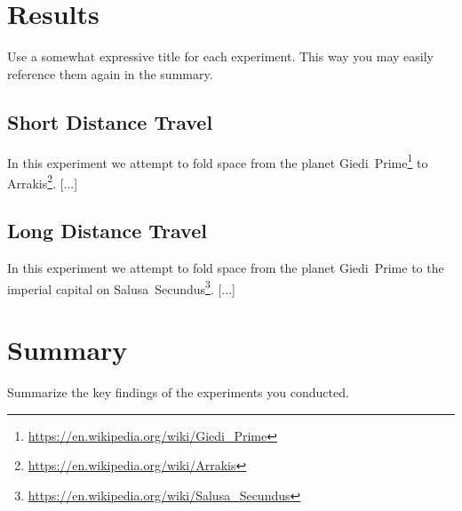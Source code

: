 \section{Results}
\label{s:Experiment-Results}

Use a somewhat expressive title for each experiment. This way you may easily reference them again in the summary.

\subsection{Short Distance Travel}
\label{s:Short-Distance-Experiment}

In this experiment we attempt to fold space from the planet Giedi~Prime\footnote{\url{https://en.wikipedia.org/wiki/Giedi_Prime}} to Arrakis\footnote{\url{https://en.wikipedia.org/wiki/Arrakis}}. [...]


\subsection{Long Distance Travel}
\label{s:Long-Distance-Experiment}

In this experiment we attempt to fold space from the planet Giedi~Prime to the imperial capital on Salusa~Secundus\footnote{\url{https://en.wikipedia.org/wiki/Salusa_Secundus}}. [...]


\section{Summary}
\label{s:Experiments-Summary}

Summarize the key findings of the experiments you conducted.
